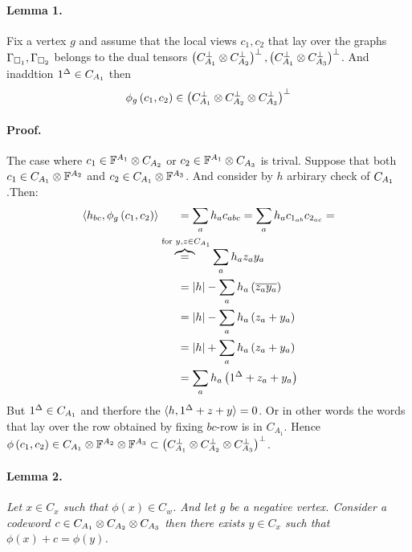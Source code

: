 \documentclass{article}
\begin{document}
\begin{multicols*}{2}
\paragraph{Lemma 1.} Fix a vertex $g$ and assume that the local views $c_1,c_2$ that lay over the graphs $\Gamma_{\square_{1}}, \Gamma_{\square_{2}}$ belongs to the dual tensors $\left( C_{A_{1}}^{\perp} \otimes C_{A_{2}}^{\perp} \right)^\perp, \left( C_{A_{1}}^{\perp} \otimes C_{A_{3}}^{\perp} \right)^\perp$. And inaddtion $ 1^{\Delta} \in C_{A_{1}} $ then 
      \begin{equation*}
      \phi_{g}\left( c_1, c_2 \right) \in \left( C_{A_{1}}^{\perp} \otimes C_{A_{2}}^{\perp} \otimes C_{A_{3}}^{\perp} \right)^\perp
    \end{equation*}
    \paragraph{Proof.} The case where $c_{1} \in \mathbb{F}^{A_{1}} \otimes C_{A_{2}}$ or $c_{2} \in \mathbb{F}^{A_{1}} \otimes C_{A_{3}} $ is trival. Suppose that both $ c_{1} \in C_{A_{1}} \otimes \mathbb{F}^{A_{2}}$ and $ c_{2} \in C_{A_{1}} \otimes \mathbb{F}^{A_{3}}$. And consider by $h$ arbirary check of $C_{A_{1}}$.Then: 
    \begin{equation*}
      \begin{split}
	\braket{h_{bc}, \phi_{g} \left( c_1, c_2 \right)  } & \ \ \ \ \ = \sum_{a}{h_{a}c_{abc}} = 
	  \sum_{a}{h_{a}c_{1_{ab}}c_{2_{ac}}} = \\ 
	  &\overset{\text{ for  } y,z\in \Aa}{\overbrace{=}}  \sum_{a} h_{a}z_{a}y_{a} \\ 
	  &\ \ \ \ \ = |h| -  \sum_{a} {h_{a} \left( \overline{ z_{a}y_{a}}  \right)} \\
	  &\ \ \ \ \ = |h| -  \sum_{a} {h_{a} \left( z_{a} + y_{a}  \right)} \\  
	  &\ \ \ \ \ = |h| +  \sum_{a} {h_{a} \left( z_{a} + y_{a}  \right)} \\ 
	  &\ \ \ \ \ =  \sum_{a} {h_{a} \left( 1^{\Delta} + z_{a} + y_{a}  \right)} 
      \end{split}
    \end{equation*}
    But $1^{\Delta} \in C_{A_{1}}$ and therfore the $ \braket{h, 1^{\Delta} + z + y} = 0 $. Or in other words the words that lay over the row obtained by fixing $bc$-row is in $ C_{A_{1}}$. Hence $\phi \left( c_{1}, c_{2} \right) \in C_{A_{1}}\otimes \mathbb{F}^{A_{2}} \otimes \mathbb{F}^{A_{3}} \subset \left( C_{A_{1}}^{\perp} \otimes C_{A_{2}}^{\perp} \otimes C_{A_{3}}^{\perp} \right)^\perp$.   

    \paragraph{Lemma 2.} \textit{ Let $x \in C_{x}$ such that $ \phi(x) \in C_{w}$. And let $g$ be a negative vertex. Consider a codeword $c \in C_{A_{1}} \otimes C_{A_{2}} \otimes C_{A_{3}}$ then there exists $y \in C_{x}$ such that $\phi\left( x \right) + c  = \phi\left(y\right)$.   }

\end{multicols*}
\end{document}
